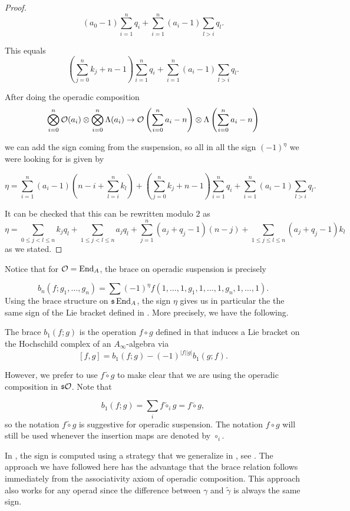 \documentclass[Thesis.tex]{subfiles}
\begin{document}
\begin{proof}
\[(a_0-1)\sum_{i=1}^nq_i+\sum_{i=1}^n (a_i-1)\sum_{l>i}q_l.\]

This equals
\[\left(\sum_{j=0}^nk_j +n-1\right)\sum_{i=1}^nq_i+\sum_{i=1}^n (a_i-1)\sum_{l>i}q_l.\]

After doing the operadic composition 
\[\bigotimes_{i=0}^n {\mathcal O}(a_i)\otimes \bigotimes_{i=0}^n \Lambda(a_i)\to {\mathcal O}\left(\sum_{i=0}^na_i-n\right)\otimes \Lambda\left(\sum_{i=0}^na_i-n\right)\]

we can add the sign coming from the suspension, so all in all the sign $(-1)^\eta$ we were looking for is given by

\[\eta=\sum_{i=1}^n(a_i-1)(n-i+\sum_{l=i}^nk_l)+(\sum_{j=0}^nk_j +n-1)\sum_{i=1}^nq_i+\sum_{i=1}^n (a_i-1)\sum_{l>i}q_l.\]

It can be checked that this can be rewritten modulo $2$ as 
\[\eta=\sum_{0\leq j<l\leq n}k_jq_l+\sum_{1\leq j<l\leq n}a_jq_l+\sum_{j=1}^n (a_j+q_j-1)(n-j)+\sum_{1\leq j\leq l\leq n} (a_j+q_j-1)k_l\]
as we stated.
\end{proof}

 Notice that for ${\mathcal O}=\operatorname{End}_A$, the brace on operadic suspension is precisely
 
 \[b_n(f;g_1,\dots,g_n)=\sum (-1)^\eta f(1,\dots,1,g_1,1,\dots,1,g_n,1,\dots,1).\]
Using the brace structure on $\mathfrak{s}\operatorname{End}_A$, the sign $\eta$ gives us in particular the the same sign of the Lie bracket defined in \cite{RW}. More precisely, we have the following.

\begin{corollary} The brace $b_1(f;g)$ is the operation $f\circ g$ defined in \cite{RW} that induces a Lie bracket on the Hochschild complex of an $A_\infty$-algebra via
\[
[f,g]=b_1(f;g)-(-1)^{|f||g|}b_1(g;f).
\]
\end{corollary} 
However, we prefer to use $f\tilde{\circ}g$ to make clear that we are using the operadic composition in $\mathfrak{s}{\mathcal O}$. Note that

\[
b_1(f;g)=\sum_i f\tilde{\circ}_i g=f\tilde{\circ}g,
\]
so the notation $f\tilde{\circ} g$ is suggestive for operadic suspension. The notation $f\circ g$ will still be used whenever the insertion maps are denoted by $\circ_i$.

In \cite{RW}, the sign is computed using a strategy that we generalize in , see . The approach we have followed here has the advantage that the brace relation follows immediately from the associativity axiom of operadic composition. This approach also works for any operad since the difference between $\gamma$ and $\tilde{\gamma}$ is always the same sign. 
\end{document}
